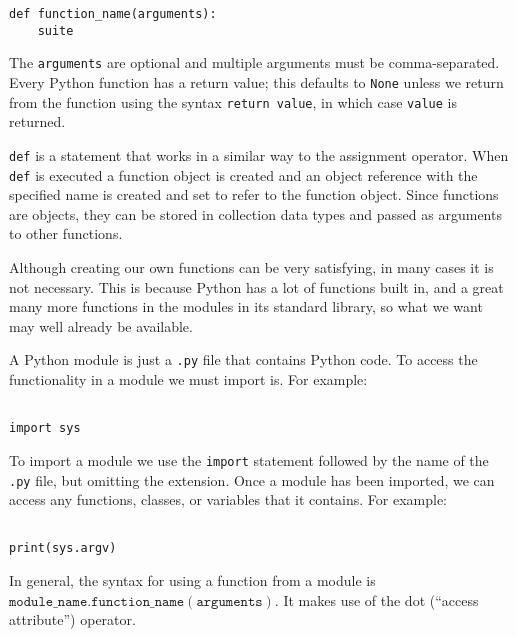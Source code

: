 \begin{tcolorbox}
\begin{verbatim}
def function_name(arguments):
    suite
\end{verbatim}
\end{tcolorbox}

The \verb|arguments| are optional and multiple arguments must be comma-separated.
Every Python function has a return value; this defaults to \verb|None| unless we return from the function using the syntax \verb|return value|, in which case \verb|value| is returned.



\verb|def| is a statement that works in a similar way to the assignment operator.
When \verb|def| is executed a function object is created and an object reference with the specified name is created and set to refer to the function object.
Since functions are objects, they can be stored in collection data types and passed as arguments to other functions.



Although creating our own functions can be very satisfying, in many cases it is not necessary.
This is because Python has a lot of functions built in, and a great many more functions in the modules in its standard library, so what we want may well already be available.


A Python module is just a \verb|.py| file that contains Python code.
To access the functionality in a module we must import is.
For example:
\begin{lstlisting}

import sys
\end{lstlisting}



To import a module we use the \verb|import| statement followed by the name of the \verb|.py| file, but omitting the extension.
Once a module has been imported, we can access any functions, classes, or variables that it contains. For example:

\begin{lstlisting}

print(sys.argv)
\end{lstlisting}




In general, the syntax for using a function from a module is \\
$\mathtt{module\_name.function\_name(arguments)}$.
It makes use of the dot (“access attribute”) operator.




